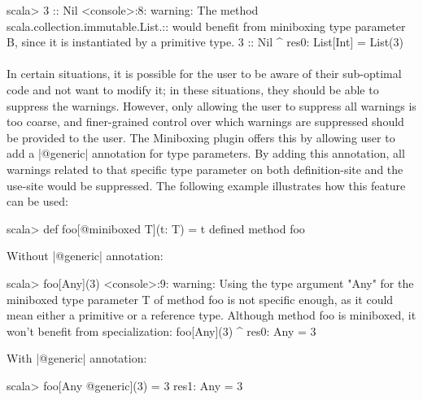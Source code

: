 \begin{lstlisting-nobreak}
scala> 3 :: Nil
<console>:8: warning: The method scala.collection.immutable.List.::
would benefit from miniboxing type parameter B, since it is
instantiated by a primitive type.
              3 :: Nil
                ^
res0: List[Int] = List(3)
\end{lstlisting-nobreak}

\paragraph{}
In certain situations, it is possible for the user to be aware of their sub-optimal code and not want to modify it; in these situations, they should be able to suppress the warnings. However, only allowing the user to suppress all warnings is too coarse, and finer-grained control over which warnings are suppressed should be provided to the user. The Miniboxing plugin offers this by allowing user to add a |@generic| annotation for type parameters. By adding this annotation, all warnings related to that specific type parameter on both definition-site and the use-site would be suppressed. The following example illustrates how this feature can be used:

\begin{lstlisting-nobreak}
scala> def foo[@miniboxed T](t: T) = t
defined method foo
\end{lstlisting-nobreak}
Without |@generic| annotation:

\begin{lstlisting-nobreak}
scala> foo[Any](3)
<console>:9: warning: Using the type argument "Any" for the miniboxed type parameter T of method foo is not specific enough, as it could mean either a primitive or a reference type. Although method foo is miniboxed, it won't benefit from specialization:
              foo[Any](3)
                 ^
res0: Any = 3
\end{lstlisting-nobreak}
With |@generic| annotation:

\begin{lstlisting-nobreak}
scala> foo[Any @generic](3) = 3
res1: Any = 3
\end{lstlisting-nobreak}

